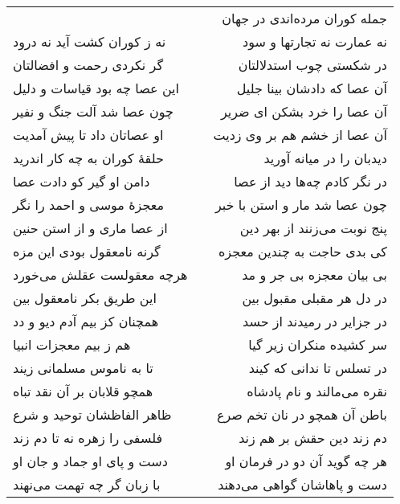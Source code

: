 \begin{center}
\begin{longtable}{l p{0.5cm} r}
&&
جمله کوران مرده‌اندی در جهان
\\
نه ز کوران کشت آید نه درود
&&
نه عمارت نه تجارتها و سود
\\
گر نکردی رحمت و افضالتان
&&
در شکستی چوب استدلالتان
\\
این عصا چه بود قیاسات و دلیل
&&
آن عصا که دادشان بینا جلیل
\\
چون عصا شد آلت جنگ و نفیر
&&
آن عصا را خرد بشکن ای ضریر
\\
او عصاتان داد تا پیش آمدیت
&&
آن عصا از خشم هم بر وی زدیت
\\
حلقهٔ کوران به چه کار اندرید
&&
دیدبان را در میانه آورید
\\
دامن او گیر کو دادت عصا
&&
در نگر کادم چه‌ها دید از عصا
\\
معجزهٔ موسی و احمد را نگر
&&
چون عصا شد مار و استن با خبر
\\
از عصا ماری و از استن حنین
&&
پنج نوبت می‌زنند از بهر دین
\\
گرنه نامعقول بودی این مزه
&&
کی بدی حاجت به چندین معجزه
\\
هرچه معقولست عقلش می‌خورد
&&
بی بیان معجزه بی جر و مد
\\
این طریق بکر نامعقول بین
&&
در دل هر مقبلی مقبول بین
\\
همچنان کز بیم آدم دیو و دد
&&
در جزایر در رمیدند از حسد
\\
هم ز بیم معجزات انبیا
&&
سر کشیده منکران زیر گیا
\\
تا به ناموس مسلمانی زیند
&&
در تسلس تا ندانی که کیند
\\
همچو قلابان بر آن نقد تباه
&&
نقره می‌مالند و نام پادشاه
\\
ظاهر الفاظشان توحید و شرع
&&
باطن آن همچو در نان تخم صرع
\\
فلسفی را زهره نه تا دم زند
&&
دم زند دین حقش بر هم زند
\\
دست و پای او جماد و جان او
&&
هر چه گوید آن دو در فرمان او
\\
با زبان گر چه تهمت می‌نهند
&&
دست و پاهاشان گواهی می‌دهند
\\
\end{longtable}
\end{center}
